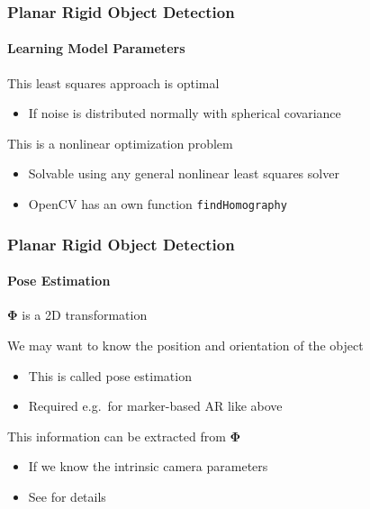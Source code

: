 \documentclass[xetex,professionalfont]{beamer}
\renewcommand\emph[1]{\textcolor{tuwcvl_inf_red}{#1}}
\begin{document}
\begin{frame}
\frametitle{Planar Rigid Object Detection}
\framesubtitle{Learning Model Parameters}

This least squares approach is optimal
\begin{itemize}
	\item If noise is distributed normally with spherical covariance %
\end{itemize}

\bigskip
This is a nonlinear optimization problem
\begin{itemize}
	\item Solvable using any general nonlinear least squares solver %
	\item OpenCV has an own function \texttt{findHomography}
\end{itemize}

\end{frame}


\begin{frame}
\frametitle{Planar Rigid Object Detection}
\framesubtitle{Pose Estimation}

$\boldsymbol{\Phi}$ is a 2D transformation

\bigskip
We may want to know the position and orientation of the object %
\begin{itemize}
    \item This is called \emph{pose estimation}
    \item Required e.g.\ for marker-based AR like above
\end{itemize}

\bigskip
This information can be extracted from $\boldsymbol{\Phi}$
\begin{itemize}
    \item If we know the intrinsic camera parameters %
    \item See \cite{prince12} for details %
\end{itemize}

\end{frame}

\end{document}

